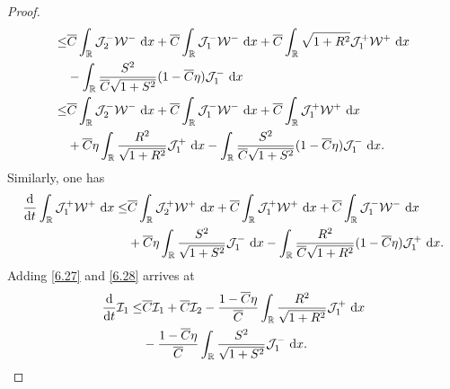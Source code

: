 \documentclass[11pt,reqno]{article}
\newcommand{\fr}{\frac}
\numberwithin{equation}{section}
\begin{document}
\begin{proof}
\begin{align}
\begin{split}
\leq &\overline{C}\int_{\mathbb{R}} \mathcal{J}_{2}^-\mathcal{W}^-\ {\rm d}x +\overline{C}\int_{\mathbb{R}} \mathcal{J}_{1}^-\mathcal{W}^-\ {\rm d}x  +\overline{C}\int_{\mathbb{R}}\sqrt{1+R^2}\mathcal{J}_{1}^+\mathcal{W}^+\ {\rm d}x  \\ & -\int_{\mathbb{R}}\fr{S^2}{\overline{C}\sqrt{1+S^2}}(1-\overline{C}\eta)\mathcal{J}_{1}^-\ {\rm d}x \\
\leq & \overline{C}\int_{\mathbb{R}} \mathcal{J}_{2}^-\mathcal{W}^-\ {\rm d}x +\overline{C}\int_{\mathbb{R}} \mathcal{J}_{1}^-\mathcal{W}^-\ {\rm d}x  +\overline{C}\int_{\mathbb{R}}\mathcal{J}_{1}^+\mathcal{W}^+\ {\rm d}x  \\ & +\overline{C}\eta\int_{\mathbb{R}}\fr{R^2}{\sqrt{1+R^2}}\mathcal{J}_{1}^+ \ {\rm d}x -\int_{\mathbb{R}}\fr{S^2}{\overline{C}\sqrt{1+S^2}}(1-\overline{C}\eta)\mathcal{J}_{1}^-\ {\rm d}x.
\end{split}
\end{align}
Similarly, one has
\begin{align}\label{6.28}
\begin{split}
\fr{{\rm d}}{{\rm d}t}\int_{\mathbb{R}} \mathcal{J}_{1}^+\mathcal{W}^+\ {\rm d}x
\leq &\overline{C}\int_{\mathbb{R}} \mathcal{J}_{2}^+\mathcal{W}^+\ {\rm d}x +\overline{C}\int_{\mathbb{R}} \mathcal{J}_{1}^+\mathcal{W}^+\ {\rm d}x  +\overline{C}\int_{\mathbb{R}}\mathcal{J}_{1}^-\mathcal{W}^-\ {\rm d}x  \\ & +\overline{C}\eta\int_{\mathbb{R}}\fr{S^2}{\sqrt{1+S^2}}\mathcal{J}_{1}^- \ {\rm d}x -\int_{\mathbb{R}}\fr{R^2}{\overline{C}\sqrt{1+R^2}}(1-\overline{C}\eta)\mathcal{J}_{1}^+\ {\rm d}x.
\end{split}
\end{align}
Adding \eqref{6.27} and \eqref{6.28} arrives at
\begin{align}\label{6.29}
\begin{split}
\fr{{\rm d}}{{\rm d}t}\mathcal{I}_1
\leq &\overline{C}\mathcal{I}_1 + \overline{C}\mathcal{I}_2 -\fr{1-\overline{C}\eta}{\overline{C}}\int_{\mathbb{R}}\fr{R^2}{\sqrt{1+R^2}}\mathcal{J}_{1}^+\ {\rm d}x \\
&-\fr{1-\overline{C}\eta}{\overline{C}}\int_{\mathbb{R}}\fr{S^2}{\sqrt{1+S^2}}\mathcal{J}_{1}^-\ {\rm d}x.
\end{split}
\end{align}


\end{proof}
\end{document}
